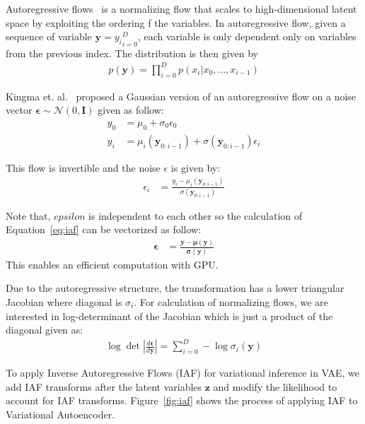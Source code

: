\documentclass[runningheads]{llncs}
\begin{document}
Autoregressive flows~\cite{germain2015made} is a normalizing flow that scales to high-dimensional latent space by exploiting the ordering f the variables. In autoregressive flow, given a sequence of variable $\mathbf{y} = {y_i}_{i=0}^D$, each variable is only dependent only on variables from the previous index. The distribution is then given by
\begin{align}
p(\mathbf{y}) = \prod_{i=0}^{D} p(x_i | x_0,\dots,x_{i-1})
\end{align} 	 

Kingma et. al.~\cite{kingma2016improved} proposed a Gaussian version of an autoregressive flow on a noise vector $\mathbf{\epsilon} \sim \mathcal{N}(0,\mathbf{I})$ given as follow:
\begin{align}
y_0 &= \mu_0 + \sigma_0 \epsilon_0\label{eq:iaffn1}\\
y_i &= \mu_i(\mathbf{y}_{0:i-1}) + \sigma(\mathbf{y}_{0:i-1}) \epsilon_i\label{eq:iaffn2}
\end{align} 

This flow is invertible and the noise $\epsilon$ is given by:
\begin{align}
\epsilon_i &= \frac{y_i - \mu_i(\mathbf{y}_{0:i-1})}{\sigma(\mathbf{y}_{0:i-1})}
\label{eq:iaf}
\end{align} 

Note that, $epsilon$ is independent to each other so the calculation of Equation~\ref{eq:iaf} can be vectorized as follow:
\begin{align}
\bm{\epsilon} &= \frac{\mathbf{y} - \bm{\mu}(\mathbf{y})}{\bm{\sigma}(\mathbf{y})}
\end{align} 
This enables an efficient computation with GPU. 

Due to the autoregressive structure, the transformation has a lower triangular Jacobian where diagonal is $\sigma_i$. For calculation of normalizing flows, we are interested in log-determinant of the Jacobian which is just a product of the diagonal given as:
\begin{align}
\log \det \left| \frac{d\bm{\epsilon}}{d\mathbf{y}} \right| = \sum_{i=0}^{D} - \log \sigma_i(\mathbf{y})
\end{align}

To apply Inverse Autoregressive Flows (IAF) for variational inference in VAE, we add IAF transforms after the latent variables $\mathbf{z}$ and modify the likelihood to account for IAF transforms. Figure~\ref{fig:iaf} shows the process of applying IAF to Variational Autoencoder. 
\end{document}
